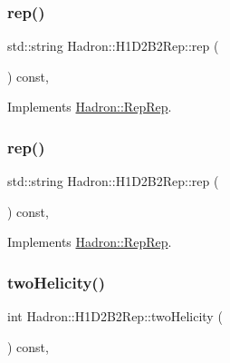 \subsubsection{\texorpdfstring{rep()}{rep()}\hspace{0.1cm}{\footnotesize\ttfamily [2/3]}}
{\footnotesize\ttfamily std\+::string Hadron\+::\+H1\+D2\+B2\+Rep\+::rep (\begin{DoxyParamCaption}{ }\end{DoxyParamCaption}) const\hspace{0.3cm}{\ttfamily [inline]}, {\ttfamily [virtual]}}



Implements \mbox{\hyperlink{structHadron_1_1RepRep_ab3213025f6de249f7095892109575fde}{Hadron\+::\+Rep\+Rep}}.

\mbox{\label{structHadron_1_1H1D2B2Rep_a12878ffcfbf3732a19b7b27407e4b026}} 
\subsubsection{\texorpdfstring{rep()}{rep()}\hspace{0.1cm}{\footnotesize\ttfamily [3/3]}}
{\footnotesize\ttfamily std\+::string Hadron\+::\+H1\+D2\+B2\+Rep\+::rep (\begin{DoxyParamCaption}{ }\end{DoxyParamCaption}) const\hspace{0.3cm}{\ttfamily [inline]}, {\ttfamily [virtual]}}



Implements \mbox{\hyperlink{structHadron_1_1RepRep_ab3213025f6de249f7095892109575fde}{Hadron\+::\+Rep\+Rep}}.

\mbox{\label{structHadron_1_1H1D2B2Rep_ac30c0bcd58285d8b5786f2fbfe58ffa2}} 
\subsubsection{\texorpdfstring{twoHelicity()}{twoHelicity()}\hspace{0.1cm}{\footnotesize\ttfamily [1/2]}}
{\footnotesize\ttfamily int Hadron\+::\+H1\+D2\+B2\+Rep\+::two\+Helicity (\begin{DoxyParamCaption}{ }\end{DoxyParamCaption}) const\hspace{0.3cm}{\ttfamily [inline]}, {\ttfamily [virtual]}}

